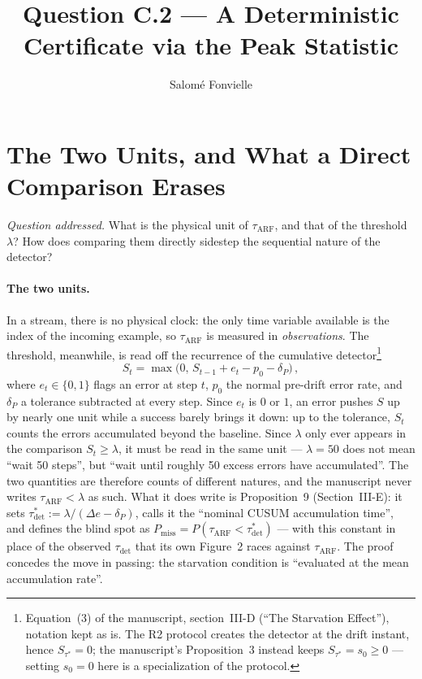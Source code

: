 \documentclass[10pt,a4paper]{article}
\title{Question C.2 --- A Deterministic Certificate via the Peak Statistic}
\author{Salomé Fonvielle}
\date{}
\begin{document}
\maketitle

\section{The Two Units, and What a Direct Comparison Erases}

\noindent\emph{Question addressed.} What is the physical unit of
$\tau_{\mathrm{ARF}}$, and that of the threshold $\lambda$? How does comparing them
directly sidestep the sequential nature of the detector?

\paragraph{The two units.} In a stream, there is no physical clock: the only time
variable available is the index of the incoming example, so $\tau_{\mathrm{ARF}}$ is
measured in \emph{observations}. The threshold, meanwhile, is read off the recurrence
of the cumulative detector\footnote{Equation~(3) of the manuscript, section~III-D
(``The Starvation Effect''), notation kept as is. The R2 protocol creates the detector
at the drift instant, hence $S_{\tau^*} = 0$; the manuscript's Proposition~3 instead
keeps $S_{\tau^*} = s_0 \ge 0$ --- setting $s_0 = 0$ here is a specialization of the
protocol.}
\begin{equation}
  S_t = \max\bigl(0,\, S_{t-1} + e_t - p_0 - \delta_P\bigr)\,,
  \label{eq:cusum}
\end{equation}
where $e_t \in \{0,1\}$ flags an error at step $t$, $p_0$ the normal pre-drift error
rate, and $\delta_P$ a tolerance subtracted at every step. Since $e_t$ is $0$ or $1$,
an error pushes $S$ up by nearly one unit while a success barely brings it down: up to
the tolerance, $S_t$ counts the errors accumulated beyond the baseline. Since
$\lambda$ only ever appears in the comparison $S_t \ge \lambda$, it must be read in
the same unit --- $\lambda = 50$ does not mean ``wait 50 steps'', but ``wait until
roughly 50 excess errors have accumulated''. The two quantities are therefore counts
of different natures, and the manuscript never writes $\tau_{\mathrm{ARF}} < \lambda$
as such. What it does write is Proposition~9 (Section~III-E): it sets
$\tau^*_{\mathrm{det}} := \lambda/(\Delta e - \delta_P)$, calls it the ``nominal CUSUM
accumulation time'', and defines the blind spot as
$P_{\mathrm{miss}} = P(\tau_{\mathrm{ARF}} < \tau^*_{\mathrm{det}})$ --- with this
constant in place of the observed $\tau_{\mathrm{det}}$ that its own Figure~2 races
against $\tau_{\mathrm{ARF}}$. The proof concedes the move in passing: the starvation
condition is ``evaluated at the mean accumulation rate''.
\end{document}
